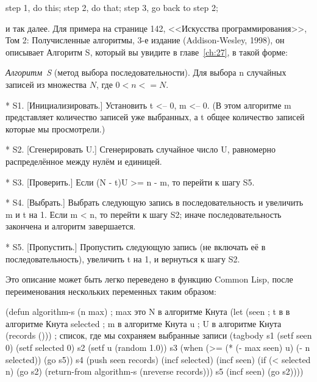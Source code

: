\begin{myverb}
step 1, do this; 
step 2, do that; 
step 3, go back to step 2;
\end{myverb}

и так далее. Для примера на странице 142, <<Искусства программирования>>, Том 2:
Получисленные алгоритмы, 3-е издание (Addison-Wesley, 1998), он описывает Алгоритм S,
который вы увидите в главе~\ref{ch:27}, в такой форме:

\textit{Алгоритм~S} (метод выбора последовательности). Для выбора n случайных записей из
множества $N$, где $0 < n <= N$.

\begin{myverb}
 * S1. [Инициализировать.] Установить t <-- 0, m <-- 0. (В этом алгоритме m 
представляет количество записей уже выбранных, а t общее количество 
записей которые мы просмотрели.)

 * S2. [Сгенерировать U.] Сгенерировать случайное число U, равномерно 
распределённое между нулём и единицей.

 * S3. [Проверить.] Если (N - t)U >= n - m, то перейти к шагу S5.

 * S4. [Выбрать.] Выбрать следующую запись в последовательность и увеличить
m и t на 1. Если m < n, то перейти к шагу S2; иначе 
последовательность закончена и алгоритм завершается.

 * S5. [Пропустить.] Пропустить следующую запись (не включать её в 
последовательность), увеличить t на 1, и вернуться к шагу S2.
\end{myverb}

Это описание может быть легко переведено в  функцию Common Lisp, после переименования
нескольких переменных таким образом:

\begin{myverb}
(defun algorithm-s (n max) ; max это N в алгоритме Кнута
  (let (seen               ; t в в алгоритме Кнута
        selected           ; m в алгоритме Кнута
        u                  ; U в алгоритме Кнута
        (records ()))      ; список, где мы сохраняем выбранные записи
    (tagbody
     s1
       (setf seen 0)
       (setf selected 0)
     s2
       (setf u (random 1.0))
     s3
       (when (>= (* (- max seen) u) (- n selected)) (go s5))
     s4
       (push seen records)
       (incf selected)
       (incf seen)
       (if (< selected n)
           (go s2)
           (return-from algorithm-s (nreverse records)))
     s5
       (incf seen)
       (go s2))))
\end{myverb}

